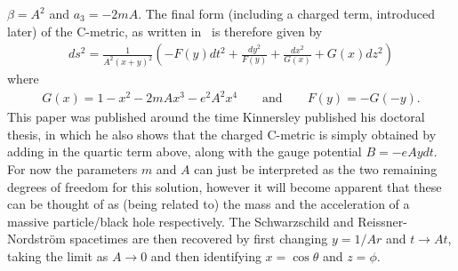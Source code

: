 \documentclass[
twoside,
openright,
frontopenright,
]{dmathesis}
\begin{document}
$\beta = A^2$ and $a_3 = -2 m A$. The final form (including a charged term,
introduced later) of the C-metric, as written in~\cite{Kinnersley:1970zw} is
therefore given by
\begin{align}
  \label{eq:kinnersley-walker-metric}
  ds^2 = \frac{1}{A^2(x+y)^2} \left(-F(y)dt^2 + \frac{dy^2}{F(y)} +
  \frac{dx^2}{G(x)} + G(x) dz^2\right)
\end{align}
where
\begin{align}
  G(x) = 1-x^2-2mAx^3-e^2 A^2 x^4\qquad \mbox{and} \qquad F(y) = -G(-y).
\end{align}
This paper was published around the time Kinnersley published his doctoral
thesis, in which he also shows that the charged C-metric is simply obtained by
adding in the quartic term above, along with the gauge potential $B = -eAydt$.
For now the parameters $m$ and $A$ can just be interpreted as the two remaining
degrees of freedom for this solution, however it will become apparent that these
can be thought of as (being related to) the mass and the acceleration of a
massive particle/black hole respectively. The Schwarzschild and
Reissner-Nordstr\"om spacetimes are then recovered by first changing $y = 1/Ar$
and $t\to At$, taking the limit as $A \to 0$ and then identifying
$x = \cos\theta$ and $z = \phi$.
\end{document}
